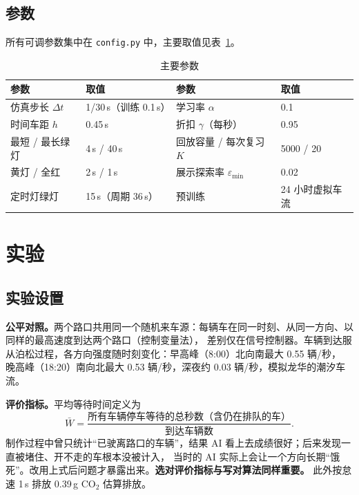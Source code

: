 \documentclass[UTF8,a4paper,zihao=-4,fontset=none]{ctexart}
\begin{document}
\subsection{参数}
所有可调参数集中在 \texttt{config.py} 中，主要取值见表~\ref{tab:params}。

\begin{table}[h]
\centering\small
\caption{主要参数}
\label{tab:params}
\begin{tabular}{llll}
\toprule
参数 & 取值 & 参数 & 取值\\
\midrule
仿真步长 $\Delta t$ & 1/30\,s（训练 0.1\,s） & 学习率 $\alpha$ & 0.1 \\
时间车距 $h$ & 0.45\,s & 折扣 $\gamma$（每秒） & 0.95 \\
最短 / 最长绿灯 & 4\,s / 40\,s & 回放容量 / 每次复习 $K$ & 5000 / 20 \\
黄灯 / 全红 & 2\,s / 1\,s & 展示探索率 $\varepsilon_{\min}$ & 0.02 \\
定时灯绿灯 & 15\,s（周期 36\,s） & 预训练 & 24 小时虚拟车流 \\
\bottomrule
\end{tabular}
\end{table}

\section{实验}

\subsection{实验设置}
\textbf{公平对照。}两个路口共用同一个随机来车源：每辆车在同一时刻、从同一方向、以同样的最高速度到达两个路口（控制变量法），
差别仅在信号控制器。车辆到达服从泊松过程，各方向强度随时刻变化：早高峰（8:00）北向南最大 0.55 辆/秒，
晚高峰（18:20）南向北最大 0.53 辆/秒，深夜约 0.03 辆/秒，模拟龙华的潮汐车流。

\textbf{评价指标。}平均等待时间定义为
\begin{equation}
  \bar W = \frac{\text{所有车辆停车等待的总秒数（含仍在排队的车）}}{\text{到达车辆数}} .
\end{equation}
制作过程中曾只统计“已驶离路口的车辆”，结果 AI 看上去成绩很好；后来发现一直被堵住、开不走的车根本没被计入，
当时的 AI 实际上会让一个方向长期“饿死”。改用上式后问题才暴露出来。\textbf{选对评价指标与写对算法同样重要。}
此外按怠速 1\,s 排放 0.39\,g CO$_2$ 估算排放。
\end{document}
